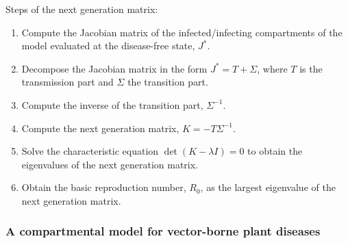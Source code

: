 \begin{theorem}
  \small\sffamily
  Steps of the next generation matrix:
  \begin{enumerate}
    \item Compute the Jacobian matrix of the infected/infecting compartments of
          the model evaluated at the disease-free state, $J^*$.
    \item Decompose the Jacobian matrix in the form $J^*=T+\Sigma$, where $T$
          is
          the transmission part and $\Sigma$ the transition part.
    \item Compute the inverse of the transition part, $\Sigma^{-1}$.
    \item Compute the next generation matrix, $K=-T\Sigma^{-1}$.
    \item Solve the characteristic equation $\det(K-\lambda I)=0$ to obtain the
          eigenvalues of the next generation matrix.
    \item Obtain the basic reproduction number, $R_0$, as the largest
          eigenvalue of the next generation matrix.
  \end{enumerate}
\end{theorem}

\subsubsection*{A compartmental model for vector-borne plant diseases}

